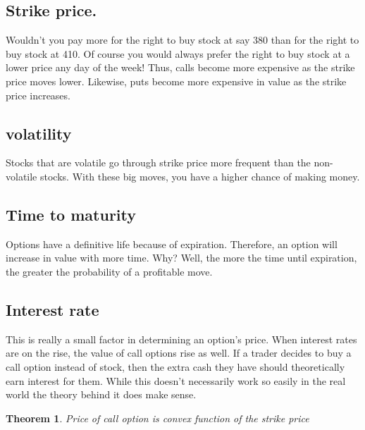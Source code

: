 \documentclass{book}
\newtheorem{theorem}{Theorem}[section]
\begin{document}
\subsection{Strike price.}
Wouldn't you pay more for the right to buy stock at say 380 than for the right to buy stock at 410. Of course you would always prefer the right to buy stock at a lower price any day of the week! Thus, calls become more expensive as the strike price moves lower. Likewise, puts become more expensive in value as the strike price increases.
\subsection{volatility}
Stocks that are volatile go through strike price more frequent than the non-volatile stocks. With these big moves, you have a higher chance of making money.
\subsection{Time to maturity}
Options have a definitive life because of expiration. Therefore, an option will increase in value with more time. Why? Well, the more the time until expiration, the greater the probability of a profitable move.
\subsection{Interest rate}
This is really a small factor in determining an option's price. When interest rates are on the rise, the value of call options rise as well. If a trader decides to buy a call option instead of stock, then the extra cash they have should theoretically earn interest for them. While this doesn't necessarily work so easily in the real world the theory behind it does make sense.
\begin{theorem}
Price of call option is convex function of the strike price
\end{theorem}
\end{document}
